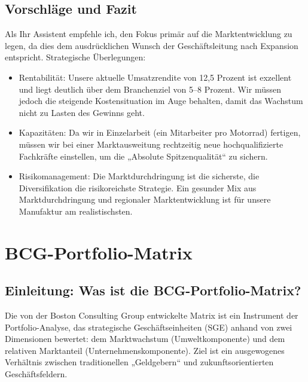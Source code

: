 \documentclass[12pt, a4paper]{article}
\begin{document}
\subsection{Vorschläge und Fazit}
Als Ihr Assistent empfehle ich, den Fokus primär auf die Marktentwicklung zu legen, da dies dem ausdrücklichen Wunsch der Geschäftsleitung nach Expansion entspricht.
Strategische Überlegungen:
\begin{itemize}
\item Rentabilität: Unsere aktuelle Umsatzrendite von 12,5 Prozent ist exzellent und liegt deutlich über dem Branchenziel von 5–8 Prozent. 
    Wir müssen jedoch die steigende Kostensituation im Auge behalten, damit das Wachstum nicht zu Lasten des Gewinns geht.
\item Kapazitäten: Da wir in Einzelarbeit (ein Mitarbeiter pro Motorrad) fertigen, müssen wir bei einer Marktausweitung 
    rechtzeitig neue hochqualifizierte Fachkräfte einstellen, um die „Absolute Spitzenqualität“ zu sichern.
\item Risikomanagement: Die Marktdurchdringung ist die sicherste, die Diversifikation die risikoreichste Strategie. 
    Ein gesunder Mix aus Marktdurchdringung und regionaler Marktentwicklung ist für unsere Manufaktur am realistischsten.
\end{itemize}
\newpage

\section{BCG-Portfolio-Matrix}
\subsection{Einleitung: Was ist die BCG-Portfolio-Matrix?}
Die von der Boston Consulting Group entwickelte Matrix ist ein Instrument der Portfolio-Analyse, das strategische Geschäftseinheiten (SGE) anhand von zwei Dimensionen bewertet: dem Marktwachstum (Umweltkomponente) und dem relativen Marktanteil (Unternehmenskomponente). Ziel ist ein ausgewogenes Verhältnis zwischen traditionellen „Geldgebern“ und zukunftsorientierten Geschäftsfeldern.
\end{document}
